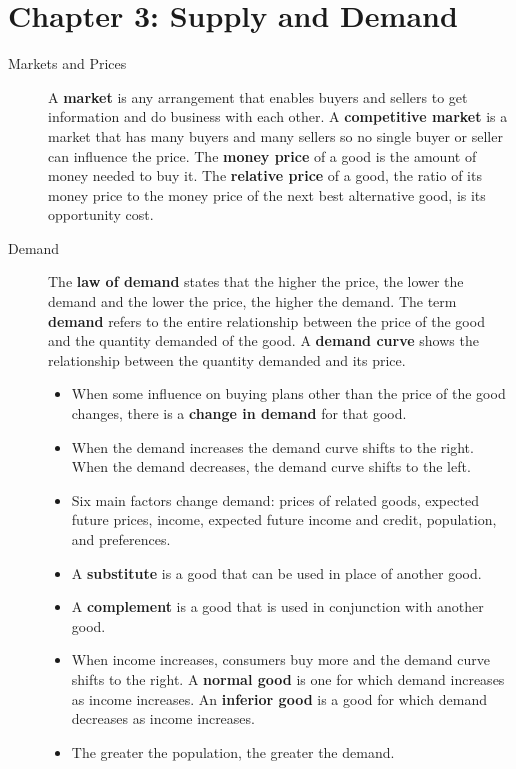 \documentclass{article}
\begin{document}
\section*{Chapter 3: Supply and Demand}
\begin{description}
    \item [Markets and Prices] A \textbf{market} is any arrangement that enables buyers and sellers to get information and do business with each other. A \textbf{competitive market} is a market that has many buyers and many sellers so no single buyer or seller can influence the price. The \textbf{money price} of a good is the amount of money needed to buy it. The \textbf{relative price} of a good, the ratio of its money price to the money price of the next best alternative good, is its opportunity cost.
    \item [Demand] The \textbf{law of demand} states that the higher the price, the lower the demand and the lower the price, the higher the demand. The term \textbf{demand} refers to the entire relationship between the price of the good and the quantity demanded of the good. A \textbf{demand curve} shows the relationship between the quantity demanded and its price.
    \begin{itemize}
        \item When some influence on buying plans other than the price of the good changes, there is a \textbf{change in demand} for that good.
        \item When the demand increases the demand curve shifts to the right. When the demand decreases, the demand curve shifts to the left.
        \item Six main factors change demand: prices of related goods, expected future prices, income, expected future income and credit, population, and preferences.
        \item A \textbf{substitute} is a good that can be used in place of another good.
        \item A \textbf{complement} is a good that is used in conjunction with another good.
        \item When income increases, consumers buy more and the demand curve shifts to the right. A \textbf{normal good} is one for which demand increases as income increases. An \textbf{inferior good} is a good for which demand decreases as income increases.
        \item The greater the population, the greater the demand.
    \end{itemize}

\end{description}
\end{document}
